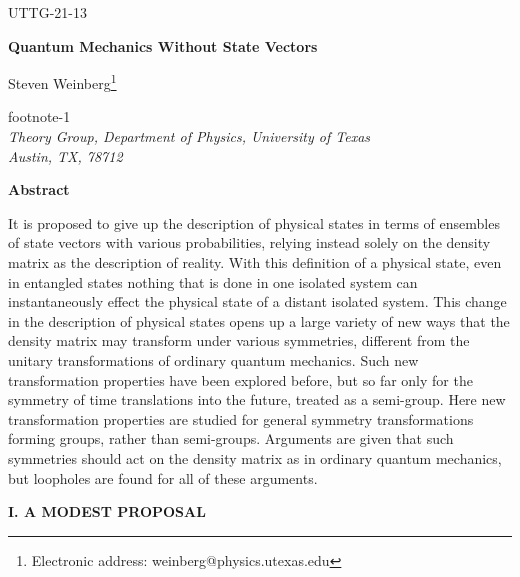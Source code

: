 \def\fnote#1#2{\begingroup\def\thefootnote{#1}\footnote{#2}\addtocounter
{footnote}{-1}\endgroup}
\def\BM#1{\mbox{\boldmath{$#1$}}}





\hfill{UTTG-21-13 }


\vspace{36pt}


\begin{center}
{\large {\bf {Quantum Mechanics Without State Vectors}}}


\vspace{36pt}
Steven Weinberg\fnote{*}{Electronic address:
weinberg@physics.utexas.edu}\\
{\em Theory Group, Department of Physics, University of
Texas\\
Austin, TX, 78712}


\vspace{30pt}

\noindent
{\bf Abstract}
\end{center}

It is proposed to give up the description of physical states in terms of ensembles of state vectors with various probabilities, relying instead solely on the density matrix as the description of reality.  With this definition of a physical state,  even in entangled states nothing that is done in one isolated system can instantaneously effect the physical state of a distant isolated system.  This change in the description of physical states opens up a large variety of new ways that the density matrix may transform under various symmetries, different from the unitary transformations of ordinary quantum mechanics.  Such new transformation properties have been explored before, but so far only for the symmetry of time translations into the future, treated as a semi-group.  Here new transformation properties are  studied for general symmetry transformations forming groups, rather than semi-groups.  Arguments are given that such symmetries should act on the density matrix as in ordinary quantum mechanics, but loopholes are found for all of these arguments.
\noindent


\vfill

\pagebreak


\begin{center}
{\bf I. A MODEST PROPOSAL}
\end{center}


